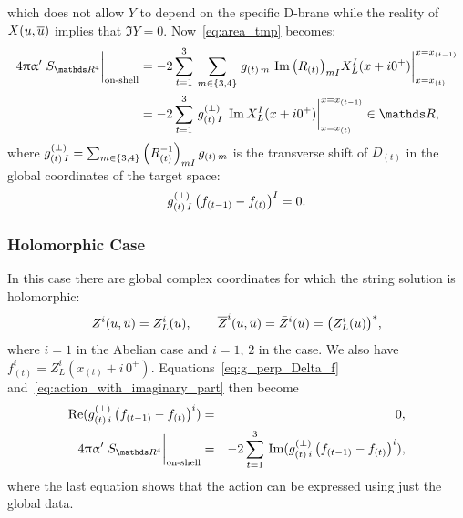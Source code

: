 which does not allow $Y$ to depend on the specific D-brane while the reality of $X(u,\overline{u})$ implies that $\Im Y = 0$.
Now~\eqref{eq:area_tmp} becomes:
\begin{equation}
  \begin{split}
    4 \pi \ap \eval{S_{\R^4}}_{\text{on-shell}}
    & =
    -2 \finitesum{t}{1}{3}\,
    \sum\limits_{m \in \{3, 4\}}
    \eval{%
      g_{(t)\, m}\,
      \tensor{\Im \qty( R_{(t)} )}{_{mI}}
      X_L^I(x+i0^+)
    }^{x = x_{(t-1)}}_{x = x_{(t)}}
    \\
    & =
    -2 \finitesum{t}{1}{3}\,
    g^{(\perp)}_{(t)\, I}\,
    \eval{%
      \Im X_L^I(x+i0^+)
    }^{x = x_{(t-1)}}_{x = x_{(t)}} \in \R,
  \end{split}
  \label{eq:action_with_imaginary_part}
\end{equation}
where $g^{(\perp)}_{(t)\, I} = \sum_{m \in \{3, 4\}} \tensor{\qty( R_{(t)}^{-1} )}{_{mI}}\, g_{(t)\, m}$ is the transverse shift of $D_{(t)}$ in the global coordinates of the target space:
\begin{equation}
  g^{(\perp)}_{(t)\, I}\, \qty(f_{(t-1)} - f_{(t)})^I = 0.
  \label{eq:g_perp_Delta_f}
\end{equation}


\subsubsection{Holomorphic Case}

In this case there are global complex coordinates for which the string solution is holomorphic:
\begin{equation}
  Z^i(u, \overline{u}) = Z^i_L(u),
  \qquad
  \overline{Z}^i(u, \overline{u}) = \bar{Z}^i(\overline{u}) = \qty( Z^i_L(u) )^*,
\end{equation}
where $i = 1$ in the Abelian case and $i=1,\, 2$ in the  case.
We also have $f^i_{(t)} = Z^i_L(x_{(t)} + i\, 0^+)$.
Equations~\eqref{eq:g_perp_Delta_f} and~\eqref{eq:action_with_imaginary_part} then become
\begin{eqnarray}
  \Re( g_{(t)\, i}^{(\perp)}\, \qty( f_{(t-1)} - f_{(t)} )^i )
  & = &
  0,
  \\
  4 \pi \ap \eval{S_{\R^4}}_{\text{on-shell}}
  & = &
  -2 \finitesum{t}{1}{3}\,
  \Im( g_{(t)\, i}^{(\perp)}\, \qty( f_{(t-1)} - f_{(t)} )^i ),
\end{eqnarray}
where the last equation shows that the action can be expressed using just the global data.

